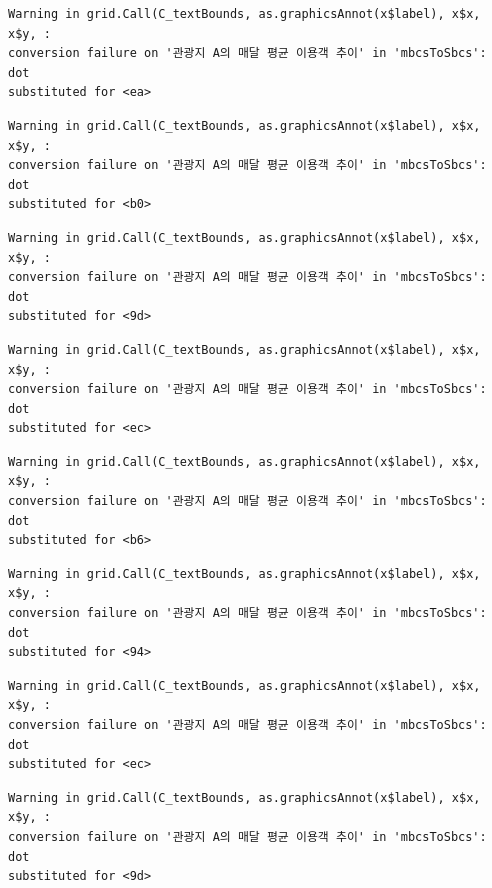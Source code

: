 \documentclass[
  letterpaper,
  DIV=11,
  numbers=noendperiod]{scrreprt}
\begin{document}
\begin{verbatim}
Warning in grid.Call(C_textBounds, as.graphicsAnnot(x$label), x$x, x$y, :
conversion failure on '관광지 A의 매달 평균 이용객 추이' in 'mbcsToSbcs': dot
substituted for <ea>
\end{verbatim}

\begin{verbatim}
Warning in grid.Call(C_textBounds, as.graphicsAnnot(x$label), x$x, x$y, :
conversion failure on '관광지 A의 매달 평균 이용객 추이' in 'mbcsToSbcs': dot
substituted for <b0>
\end{verbatim}

\begin{verbatim}
Warning in grid.Call(C_textBounds, as.graphicsAnnot(x$label), x$x, x$y, :
conversion failure on '관광지 A의 매달 평균 이용객 추이' in 'mbcsToSbcs': dot
substituted for <9d>
\end{verbatim}

\begin{verbatim}
Warning in grid.Call(C_textBounds, as.graphicsAnnot(x$label), x$x, x$y, :
conversion failure on '관광지 A의 매달 평균 이용객 추이' in 'mbcsToSbcs': dot
substituted for <ec>
\end{verbatim}

\begin{verbatim}
Warning in grid.Call(C_textBounds, as.graphicsAnnot(x$label), x$x, x$y, :
conversion failure on '관광지 A의 매달 평균 이용객 추이' in 'mbcsToSbcs': dot
substituted for <b6>
\end{verbatim}

\begin{verbatim}
Warning in grid.Call(C_textBounds, as.graphicsAnnot(x$label), x$x, x$y, :
conversion failure on '관광지 A의 매달 평균 이용객 추이' in 'mbcsToSbcs': dot
substituted for <94>
\end{verbatim}

\begin{verbatim}
Warning in grid.Call(C_textBounds, as.graphicsAnnot(x$label), x$x, x$y, :
conversion failure on '관광지 A의 매달 평균 이용객 추이' in 'mbcsToSbcs': dot
substituted for <ec>
\end{verbatim}

\begin{verbatim}
Warning in grid.Call(C_textBounds, as.graphicsAnnot(x$label), x$x, x$y, :
conversion failure on '관광지 A의 매달 평균 이용객 추이' in 'mbcsToSbcs': dot
substituted for <9d>
\end{verbatim}
\end{document}
